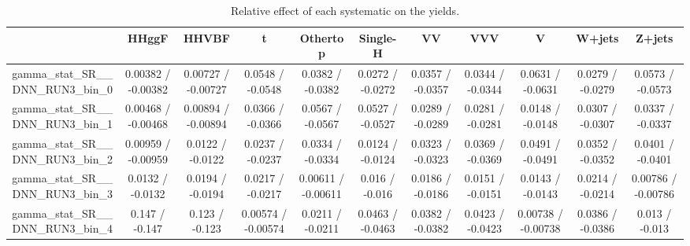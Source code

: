 \documentclass[10pt]{article}
\begin{document}
\begin{table}[htbp]
\begin{center}
\begin{tabular}{|c|c|c|c|c|c|c|c|c|c|c|}
\hline 
      & HHggF      & HHVBF      & t      & Othertop      & Single-H      & VV      & VVV      & V      & W+jets      & Z+jets \\ 
\hline 
  gamma_stat_SR__DNN_RUN3_bin_0 & 0.00382 / -0.00382 & 0.00727 / -0.00727 & 0.0548 / -0.0548 & 0.0382 / -0.0382 & 0.0272 / -0.0272 & 0.0357 / -0.0357 & 0.0344 / -0.0344 & 0.0631 / -0.0631 & 0.0279 / -0.0279 & 0.0573 / -0.0573 \\ 
  gamma_stat_SR__DNN_RUN3_bin_1 & 0.00468 / -0.00468 & 0.00894 / -0.00894 & 0.0366 / -0.0366 & 0.0567 / -0.0567 & 0.0527 / -0.0527 & 0.0289 / -0.0289 & 0.0281 / -0.0281 & 0.0148 / -0.0148 & 0.0307 / -0.0307 & 0.0337 / -0.0337 \\ 
  gamma_stat_SR__DNN_RUN3_bin_2 & 0.00959 / -0.00959 & 0.0122 / -0.0122 & 0.0237 / -0.0237 & 0.0334 / -0.0334 & 0.0124 / -0.0124 & 0.0323 / -0.0323 & 0.0369 / -0.0369 & 0.0491 / -0.0491 & 0.0352 / -0.0352 & 0.0401 / -0.0401 \\ 
  gamma_stat_SR__DNN_RUN3_bin_3 & 0.0132 / -0.0132 & 0.0194 / -0.0194 & 0.0217 / -0.0217 & 0.00611 / -0.00611 & 0.016 / -0.016 & 0.0186 / -0.0186 & 0.0151 / -0.0151 & 0.0143 / -0.0143 & 0.0214 / -0.0214 & 0.00786 / -0.00786 \\ 
  gamma_stat_SR__DNN_RUN3_bin_4 & 0.147 / -0.147 & 0.123 / -0.123 & 0.00574 / -0.00574 & 0.0211 / -0.0211 & 0.0463 / -0.0463 & 0.0382 / -0.0382 & 0.0423 / -0.0423 & 0.00738 / -0.00738 & 0.0386 / -0.0386 & 0.013 / -0.013 \\ 
\hline 
\end{tabular} 
\caption{Relative effect of each systematic on the yields.} 
\end{center} 
\end{table} 
\end{document}
